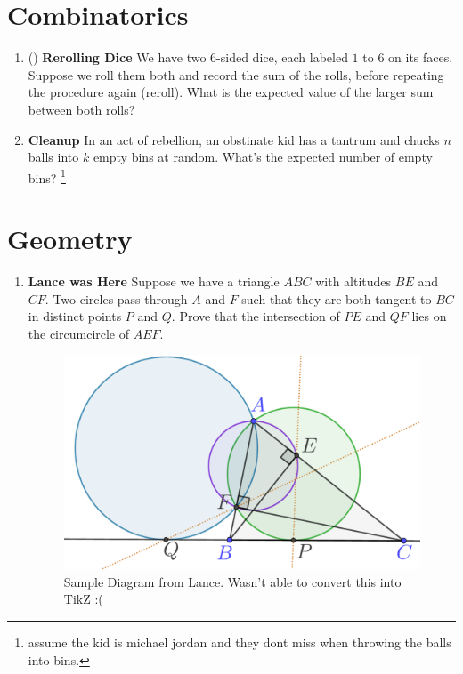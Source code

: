 \documentclass[11pt]{scrartcl}
\begin{document}
\newpage
\section{Combinatorics}
\begin{enumerate}[label=\textbf{C\arabic*}.]
    \item (\halfchili) \textbf{Rerolling Dice} \newline
    We have two $6$-sided dice, each labeled $1$ to $6$ on its faces. Suppose we roll them both and record the sum of the rolls, before repeating the procedure again (reroll). What is the expected value of the larger sum between both rolls?

    \item \textbf{Cleanup} \newline
    In an act of rebellion, an obstinate kid has a tantrum and chucks $n$ balls into $k$ empty bins at random. What's the expected number of empty bins? \footnote{assume the kid is michael jordan and they dont miss when throwing the balls into bins.}
    
\end{enumerate}

\newpage
\section{Geometry}
\begin{enumerate}[label=\textbf{G\arabic*}.]
    \item \textbf{Lance was Here} \newline
    Suppose we have a triangle $ABC$ with altitudes $BE$ and $CF$. Two circles pass through $A$ and $F$ such that they are both tangent to $BC$ in distinct points $P$ and $Q$. Prove that the intersection of $PE$ and $QF$ lies on the circumcircle of $AEF$.

    \begin{figure}[h]
        \centering
        \includegraphics[width = 12cm]{weekly/week 20/Diagrams/lancegeow20.pdf} %
        \caption{Sample Diagram from Lance. Wasn't able to convert this into TikZ :(}
        \label{fig:lancewashere}
    \end{figure} 
\end{enumerate}
\end{document}
